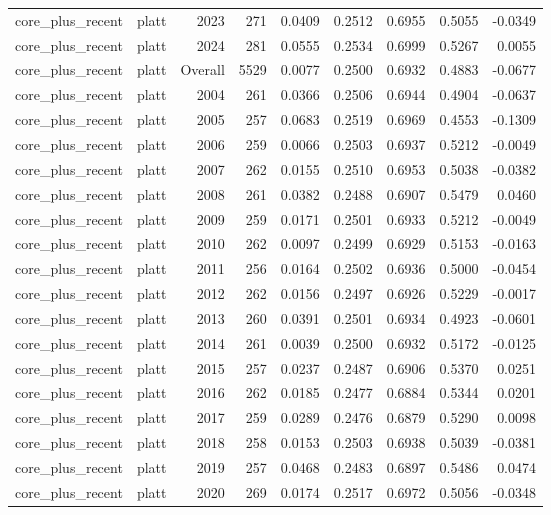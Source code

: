 \begin{table}[t]
\begin{tabular}{@{} l l r r r r r r r @{} }
      core\_plus\_recent & platt & 2023 & 271 & 0.0409 & 0.2512 & 0.6955 & 0.5055 & -0.0349 \\
      core\_plus\_recent & platt & 2024 & 281 & 0.0555 & 0.2534 & 0.6999 & 0.5267 & 0.0055 \\
      core\_plus\_recent & platt & Overall & 5529 & 0.0077 & 0.2500 & 0.6932 & 0.4883 & -0.0677 \\
      core\_plus\_recent & platt & 2004 & 261 & 0.0366 & 0.2506 & 0.6944 & 0.4904 & -0.0637 \\
      core\_plus\_recent & platt & 2005 & 257 & 0.0683 & 0.2519 & 0.6969 & 0.4553 & -0.1309 \\
      core\_plus\_recent & platt & 2006 & 259 & 0.0066 & 0.2503 & 0.6937 & 0.5212 & -0.0049 \\
      core\_plus\_recent & platt & 2007 & 262 & 0.0155 & 0.2510 & 0.6953 & 0.5038 & -0.0382 \\
      core\_plus\_recent & platt & 2008 & 261 & 0.0382 & 0.2488 & 0.6907 & 0.5479 & 0.0460 \\
      core\_plus\_recent & platt & 2009 & 259 & 0.0171 & 0.2501 & 0.6933 & 0.5212 & -0.0049 \\
      core\_plus\_recent & platt & 2010 & 262 & 0.0097 & 0.2499 & 0.6929 & 0.5153 & -0.0163 \\
      core\_plus\_recent & platt & 2011 & 256 & 0.0164 & 0.2502 & 0.6936 & 0.5000 & -0.0454 \\
      core\_plus\_recent & platt & 2012 & 262 & 0.0156 & 0.2497 & 0.6926 & 0.5229 & -0.0017 \\
      core\_plus\_recent & platt & 2013 & 260 & 0.0391 & 0.2501 & 0.6934 & 0.4923 & -0.0601 \\
      core\_plus\_recent & platt & 2014 & 261 & 0.0039 & 0.2500 & 0.6932 & 0.5172 & -0.0125 \\
      core\_plus\_recent & platt & 2015 & 257 & 0.0237 & 0.2487 & 0.6906 & 0.5370 & 0.0251 \\
      core\_plus\_recent & platt & 2016 & 262 & 0.0185 & 0.2477 & 0.6884 & 0.5344 & 0.0201 \\
      core\_plus\_recent & platt & 2017 & 259 & 0.0289 & 0.2476 & 0.6879 & 0.5290 & 0.0098 \\
      core\_plus\_recent & platt & 2018 & 258 & 0.0153 & 0.2503 & 0.6938 & 0.5039 & -0.0381 \\
      core\_plus\_recent & platt & 2019 & 257 & 0.0468 & 0.2483 & 0.6897 & 0.5486 & 0.0474 \\
      core\_plus\_recent & platt & 2020 & 269 & 0.0174 & 0.2517 & 0.6972 & 0.5056 & -0.0348 \\

\end{tabular}
\end{table}
